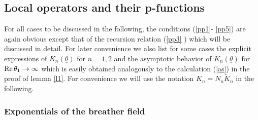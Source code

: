 \documentclass[a4paper,a4paper]{article}
\begin{document}
\subsection{Local operators and their p-functions}

For all cases to be discussed in the following, the conditions (\ref{pp1}-%
\ref{pp5}) are again obvious except that of the recursion relation (\ref{pp3}%
) which will be discussed in detail. For later convenience we also list for
some cases the explicit expressions of $K_{n}(\underline{\theta })$ for $%
n=1,2$ and the asymptotic behavior of $K_{n}(\underline{\theta })$ for $%
\mathop{\rm Re}\theta _{1}\rightarrow \infty $ which is easily obtained
analogously to the calculation (\ref{as}) in the proof of lemma \ref{l1}.
For convenience we will use the notation $K_{n}=N_{n}\tilde{K}_{n}$ in the
following.

\subsubsection{Exponentials of the breather field}
\end{document}
